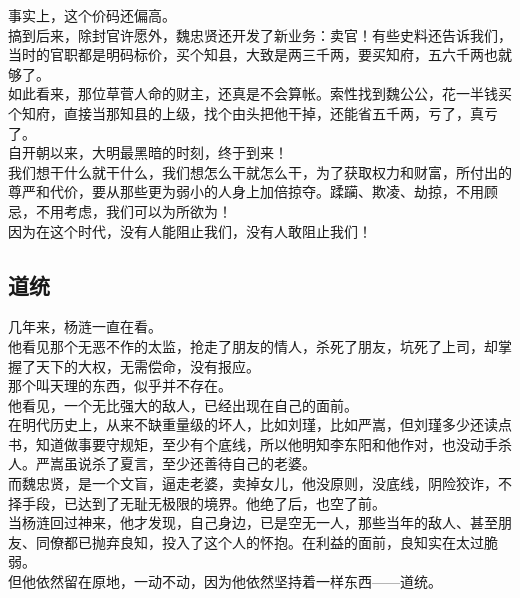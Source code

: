 \begin{multicols}{\theparacolNo}
事实上，这个价码还偏高。\\

搞到后来，除封官许愿外，魏忠贤还开发了新业务：卖官！有些史料还告诉我们，当时的官职都是明码标价，买个知县，大致是两三千两，要买知府，五六千两也就够了。\\

如此看来，那位草菅人命的财主，还真是不会算帐。索性找到魏公公，花一半钱买个知府，直接当那知县的上级，找个由头把他干掉，还能省五千两，亏了，真亏了。\\

自开朝以来，大明最黑暗的时刻，终于到来！\\

我们想干什么就干什么，我们想怎么干就怎么干，为了获取权力和财富，所付出的尊严和代价，要从那些更为弱小的人身上加倍掠夺。蹂躏、欺凌、劫掠，不用顾忌，不用考虑，我们可以为所欲为！\\

因为在这个时代，没有人能阻止我们，没有人敢阻止我们！\\

\subsection{道统}
几年来，杨涟一直在看。\\

他看见那个无恶不作的太监，抢走了朋友的情人，杀死了朋友，坑死了上司，却掌握了天下的大权，无需偿命，没有报应。\\

那个叫天理的东西，似乎并不存在。\\

他看见，一个无比强大的敌人，已经出现在自己的面前。\\

在明代历史上，从来不缺重量级的坏人，比如刘瑾，比如严嵩，但刘瑾多少还读点书，知道做事要守规矩，至少有个底线，所以他明知李东阳和他作对，也没动手杀人。严嵩虽说杀了夏言，至少还善待自己的老婆。\\

而魏忠贤，是一个文盲，逼走老婆，卖掉女儿，他没原则，没底线，阴险狡诈，不择手段，已达到了无耻无极限的境界。他绝了后，也空了前。\\

当杨涟回过神来，他才发现，自己身边，已是空无一人，那些当年的敌人、甚至朋友、同僚都已抛弃良知，投入了这个人的怀抱。在利益的面前，良知实在太过脆弱。\\

但他依然留在原地，一动不动，因为他依然坚持着一样东西——道统。\\


\end{multicols}
